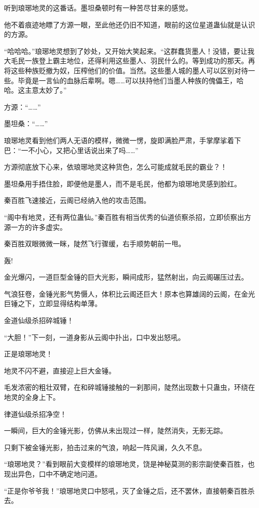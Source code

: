 \begin{this_body}
听到琅琊地灵的这番话。墨坦桑顿时有一种苦尽甘来的感觉。

他不着痕迹地瞟了方源一眼，至此他还仍旧不知道，眼前的这位星道蛊仙就是认识的方源。

“哈哈哈。”琅琊地灵想到了妙处，又开始大笑起来。“这群蠢货墨人！没错，要让我大毛民一族登上霸主地位，还得利用这些墨人、羽民什么的。等到成功的那天。再将这些种族贬撤为奴，压榨他们的价值。当然。这些墨人城的墨人可以区别对待一些。毕竟是一言仙的血脉后辈啊。嗯……可以扶持他们当墨人种族的傀儡王，哈哈。这主意太妙了。”

方源：“……”

墨坦桑：“……”

琅琊地灵看到他们两人无语的模样，微微一愣，旋即满脸严肃，手掌摩挲着下巴：“一不小心，又把心里话说出来了吗……”

方源彻底放下心来，依琅琊地灵这种货色，怎么可能成就毛民的霸业？！

墨坦桑用手捂住脸，即便他是墨人，而不是毛民，他都为琅琊地灵感到脸红。

秦百胜飞速接近，云阁已经纳入他的攻击范围。

“阁中有地灵，还有两位蛊仙。”秦百胜有相当优秀的仙道侦察杀招，立即侦察出方源一方的许多虚实。

秦百胜双眼微微一眯，陡然飞行骤缓，右手顺势朝前一甩。

轰!

金光爆闪，一道巨型金锤的巨大光影，瞬间成形，猛然射出，向云阁碾压过去。

气浪狂卷，金锤光影气势慑人，体积比云阁还巨大！原本也算雄阔的云阁，在金光巨锤之下，立即显得结构单薄。

金道仙级杀招碎城锤！

“大胆！”下一刻，一道身影从云阁中扑出，口中发出怒吼。

正是琅琊地灵！

地灵不闪不避，直接迎上巨大金锤。

毛发浓密的粗壮双臂，在和碎城锤接触的一刹那间，陡然出现数十只蛊虫，环绕在地灵的全身上下。

律道仙级杀招净空！

一瞬间，巨大的金锤光影，仿佛从未出现过一样，陡然消失，无影无踪。

只剩下被金锤光影，拍击过来的气浪，响起一阵风澜，久久不息。

“琅琊地灵？”看到眼前大变模样的琅琊地灵，饶是神秘莫测的影宗副使秦百胜，也现出异色，口中不确定地问道。

“正是你爷爷我！”琅琊地灵口中怒吼，灭了金锤之后，还不罢休，直接朝秦百胜杀去。


\end{this_body}
